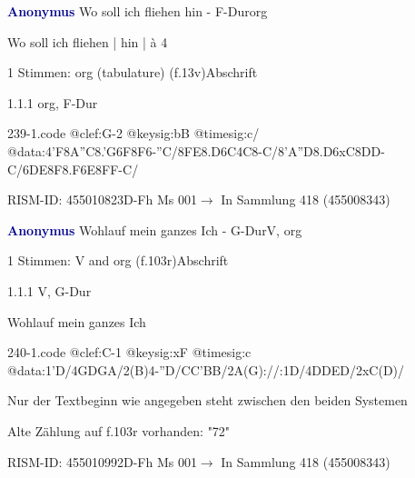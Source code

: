 \documentclass[twocolumn, 12pt]{book}
\begin{document}
\par \vspace{16pt} \textcolor{darkblue}{\textbf{Anonymus  }}\hfillplus{\textbf{[239]}}\newline Wo soll ich fliehen hin - F-Dur\newline org
\par \begin{itshape}[f.13v, at left:] Wo soll ich fliehen | hin | à 4\end{itshape} 
\par \textcolor{darkblue}{}  1 Stimmen: org (tabulature)  (f.13v)\newline Abschrift
\par 1.1.1  org, F-Dur  
\begin{filecontents*}{239-1.code}
@clef:G-2
@keysig:bB
@timesig:c/
@data:4'F{8A''C}{8.'G6F}8F6-''C/{8FE8.D6C}4C8-C/{8'A''D8.D6xC}{8DD}-C/{6DE8F8.F6E}{8FF}-C/
\end{filecontents*}
\newline %
\par RISM-ID: 455010823\newline D-Fh  Ms 001\newline $\rightarrow$ In Sammlung 418 (455008343)
      
\par \vspace{16pt} \textcolor{darkblue}{\textbf{Anonymus  }}\hfillplus{\textbf{[240]}}\newline Wohlauf mein ganzes Ich - G-Dur\newline V, org
\par \begin{itshape}\end{itshape} 
\par \textcolor{darkblue}{}  1 Stimmen: V and org  (f.103r)\newline Abschrift
\par 1.1.1  V, G-Dur\newline \begin{footnotesize} Wohlauf mein ganzes Ich \end{footnotesize}  
\begin{filecontents*}{240-1.code}
@clef:C-1
@keysig:xF
@timesig:c
@data:1'D/4GDGA/2(B)4-''D/CC'BB/2A(G)://:1D/4DDED/2xC(D)/
\end{filecontents*}
\newline %
\par Nur der Textbeginn wie angegeben steht zwischen den beiden Systemen
\par Alte Zählung auf f.103r vorhanden: "72"
\par RISM-ID: 455010992\newline D-Fh  Ms 001\newline $\rightarrow$ In Sammlung 418 (455008343)
      
\end{document}
